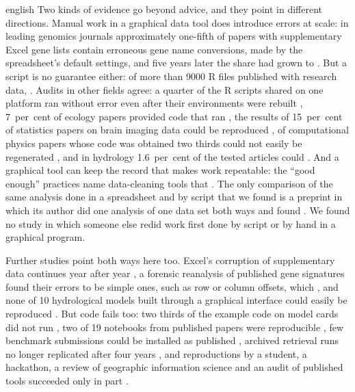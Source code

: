 \begin{onlyin}{english}
Two kinds of evidence go beyond advice, and they point in different
directions.  Manual work in a graphical data tool does introduce errors
at scale: in leading genomics journals 
{approximately one-fifth of papers with supplementary Excel gene lists
contain erroneous gene name conversions}, made by the spreadsheet's
default settings, and five years later the share had grown to
.  But a script is no guarantee either:
of more than 9000 R files published with research data,
.  Audits in other fields agree: a quarter of the
R scripts shared on one platform ran without error even after their
environments were rebuilt \autocite{Saju2025Computational}, 7~per~cent
of ecology papers provided code that ran \autocite{Kellner2024Functional},
the results of 15~per~cent of statistics papers on brain imaging data
could be reproduced \autocite{Xiong2022State}, of computational physics
papers whose code was obtained two thirds could not easily be
regenerated \autocite{Stodden2018Enabling}, and in hydrology
1.6~per~cent of the tested articles could \autocite{Stagge2019Assessing}.
And a graphical tool can keep the record that makes work repeatable:
the \enquote{good enough} practices name data-cleaning tools that
.  The only
comparison of the same analysis done in a spreadsheet and by script
that we found is a preprint in which its author did one analysis of
one data set both ways and found .  We found no study in which someone else redid work
first done by script or by hand in a graphical program.

Further studies point both ways here too.  Excel's corruption of
supplementary data continues year after year
\autocite{DeRijk2018Opentsv}, a forensic reanalysis of published gene
signatures found their errors to be simple ones, such as row or column
offsets, which , and none of 10 hydrological models
built
through a graphical interface could easily be reproduced
\autocite{Chawanda2020User}.  But code fails too: two thirds of the
example code on model cards did not run \autocite{Yao2026Understanding},
two of 19 notebooks from published papers were reproducible
\autocite{Kashiwa2026Study}, few benchmark submissions could be installed
as published \autocite{Lyu2026Code}, archived retrieval runs no longer
replicated after four years \autocite{Lin2020Reproducibility}, and
reproductions by a student, a hackathon, a review of geographic
information science and an audit of published tools succeeded only in
part \autocite{Oneka2018Evaluating,Willems2026Insights,%
Nust2022Infrastructures,Nong2023Open}.
\end{onlyin}
